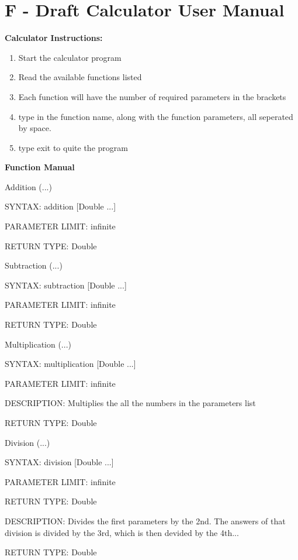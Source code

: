 \documentclass[a4paper]{article}
\begin{document}
\pagebreak

\section{F - Draft Calculator User Manual}

\begin{flushleft}

\textbf{\Large Calculator Instructions:}

\begin{enumerate}
\item Start the calculator program 
\item Read the available functions listed
\item Each function will have the number of required parameters in the brackets 
\item type in the function name, along with the function parameters, all seperated by space.
\item type exit to quite the program
\end{enumerate}


\textbf{\Large Function Manual}

Addition (...)
\begin{compactitem}
  \item [] SYNTAX: addition [Double ...]
  \item [] PARAMETER LIMIT: infinite
  \item [] RETURN TYPE: Double
\end{compactitem}
\medskip

Subtraction (...)
\begin{compactitem}
  \item [] SYNTAX: subtraction [Double ...]
  \item [] PARAMETER LIMIT: infinite
  \item [] RETURN TYPE: Double
\end{compactitem}
\medskip

Multiplication (...)
\begin{compactitem}
  \item [] SYNTAX: multiplication [Double ...]
  \item [] PARAMETER LIMIT: infinite
  \item [] DESCRIPTION: Multiplies the all the numbers in the parameters list
  \item [] RETURN TYPE: Double
\end{compactitem}
\medskip

Division (...)
\begin{compactitem}
  \item [] SYNTAX: division [Double ...]
  \item [] PARAMETER LIMIT: infinite
  \item [] RETURN TYPE: Double
  \item [] DESCRIPTION: Divides the first parameters by the 2nd. The answers of 
               that division is divided by the 3rd, which is then 
	       devided by the 4th...
  \item [] RETURN TYPE: Double
\end{compactitem}
\medskip


\end{flushleft}
\end{document}
